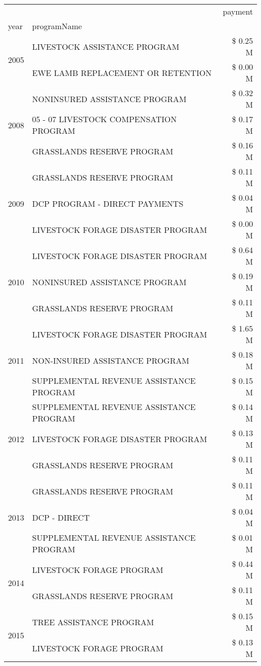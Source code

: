 \begin{tabular}{llr}
\toprule
 &  & payment \\
year & programName &  \\
\midrule
\multirow[t]{2}{*}{2005} & LIVESTOCK ASSISTANCE PROGRAM & \$ 0.25 M \\
 & EWE LAMB REPLACEMENT OR RETENTION & \$ 0.00 M \\
\cline{1-3}
\multirow[t]{3}{*}{2008} & NONINSURED ASSISTANCE PROGRAM & \$ 0.32 M \\
 & 05 - 07 LIVESTOCK COMPENSATION PROGRAM & \$ 0.17 M \\
 & GRASSLANDS RESERVE PROGRAM & \$ 0.16 M \\
\cline{1-3}
\multirow[t]{3}{*}{2009} & GRASSLANDS RESERVE PROGRAM & \$ 0.11 M \\
 & DCP PROGRAM - DIRECT PAYMENTS & \$ 0.04 M \\
 & LIVESTOCK FORAGE DISASTER  PROGRAM & \$ 0.00 M \\
\cline{1-3}
\multirow[t]{3}{*}{2010} & LIVESTOCK FORAGE DISASTER PROGRAM & \$ 0.64 M \\
 & NONINSURED ASSISTANCE PROGRAM & \$ 0.19 M \\
 & GRASSLANDS RESERVE PROGRAM & \$ 0.11 M \\
\cline{1-3}
\multirow[t]{3}{*}{2011} & LIVESTOCK FORAGE DISASTER PROGRAM & \$ 1.65 M \\
 & NON-INSURED ASSISTANCE PROGRAM & \$ 0.18 M \\
 & SUPPLEMENTAL REVENUE ASSISTANCE PROGRAM & \$ 0.15 M \\
\cline{1-3}
\multirow[t]{3}{*}{2012} & SUPPLEMENTAL REVENUE ASSISTANCE PROGRAM & \$ 0.14 M \\
 & LIVESTOCK FORAGE DISASTER PROGRAM & \$ 0.13 M \\
 & GRASSLANDS RESERVE PROGRAM & \$ 0.11 M \\
\cline{1-3}
\multirow[t]{3}{*}{2013} & GRASSLANDS RESERVE PROGRAM & \$ 0.11 M \\
 & DCP - DIRECT & \$ 0.04 M \\
 & SUPPLEMENTAL REVENUE ASSISTANCE PROGRAM & \$ 0.01 M \\
\cline{1-3}
\multirow[t]{2}{*}{2014} & LIVESTOCK FORAGE PROGRAM & \$ 0.44 M \\
 & GRASSLANDS RESERVE PROGRAM & \$ 0.11 M \\
\cline{1-3}
\multirow[t]{3}{*}{2015} & TREE ASSISTANCE PROGRAM & \$ 0.15 M \\
 & LIVESTOCK FORAGE PROGRAM & \$ 0.13 M \\

\end{tabular}
